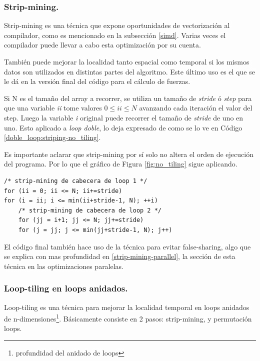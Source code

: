 \documentclass{article}
\begin{document}
\subsubsection{Strip-mining.\label{strip-mining}}
Strip-mining es una técnica que expone oportunidades de vectorización al compilador, como es mencionado
en la subsección \ref{simd}. Varias veces el compilador puede llevar a cabo esta optimización por su cuenta.


También puede mejorar la localidad tanto espacial como temporal si los mismos datos son utilizados en distintas partes
del algoritmo. Este último uso es el que se le dá en la versión final del código para el cálculo de fuerzas.


Si N es el tamaño del array a recorrer, se utiliza un tamaño de \textit{stride} ó \textit{step} para que una variable \textit{ii}
tome valores $0\leq{ii}\leq N$ avanzando cada iteración el valor del step. Luego la variable \textit{i} original puede recorrer
el tamaño de \textit{stride} de uno en uno. Esto aplicado a \textit{loop doble}, lo deja expresado de como se lo ve en
Código \ref{doble_loop:striping-no_tiling}.

Es importante aclarar que strip-mining por sí solo no altera el orden de ejecución del programa. Por lo
que el gráfico de Figura \ref{fig:no_tiling} sigue aplicando.

\begin{lstlisting}[style=CStyle,label=doble_loop:striping-no_tiling,caption=doble loop con strip-mining en ambos loops.]
/* strip-mining de cabecera de loop 1 */
for (ii = 0; ii <= N; ii+=stride)
for (i = ii; i <= min(ii+stride-1, N); ++i)
	/* strip-mining de cabecera de loop 2 */
	for (jj = i+1; jj <= N; jj+=stride)
	for (j = jj; j <= min(jj+stride-1, N); j++)
\end{lstlisting}


El código final también hace uso de la técnica para evitar false-sharing, algo que se explica con mas profundidad
en \ref{strip-mining-parallel}, la sección de esta técnica en las optimizaciones paralelas.

\subsubsection{Loop-tiling en loops anidados.\label{loop-tiling}}

Loop-tiling es una técnica para mejorar la localidad temporal en loops anidados de
n-dimensiones\footnote{profundidad del anidado de loops}. Básicamente consiste en 2 pasos: strip-mining, y permutación loops.
\end{document}
